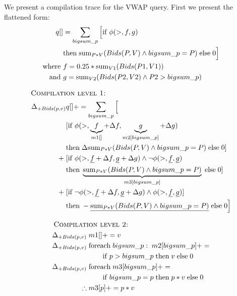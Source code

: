 \begin{example}
We present a compilation trace for the VWAP query. First we present the
flattened form:
\begin{align*}
q[] & = \sum_{bigsum\_p}{\Big[\mathrm{if} \; \phi(>, f, g) }\\
    & \mathrm{then} \; \mathrm{sum}_{P*V}(Bids(P,V) \wedge bigsum\_p = P) \;
      \mathrm{else} \; 0 \Big]\\
\mbox{where } & f = 0.25*\mathrm{sum}_{V1}(Bids(P1,V1))\\
\mbox{and } & g = \mathrm{sum}_{V2}(Bids(P2,V2) \wedge P2 > bigsum\_p)
\end{align*}

\begin{align*}
& \hspace{-1.75cm}\mbox{\sc Compilation level 1:}\\
\Delta_{+Bids(p,v)} & q[] += \sum_{bigsum\_p} \Big[ \\
& [ \algif \; \phi(>,\underbrace{f}_{m1[]}+\Delta f, \underbrace{g}_{m2[bigsum\_p]}+\Delta g) \; \\
& \algthen \; \Delta \algsum_{P*V}(Bids(P,V) \wedge bigsum\_p = P) \;
    \algelse \; 0 ] \\
+ \; & [ \algif \; \phi(>,\underline{f}+\Delta f, \underline{g}+\Delta g) \wedge
    \neg\phi(>,\underline{f},\underline{g}) \\
& \algthen \; \underbrace{\algsum_{P*V}(Bids(P,V) \wedge
    bigsum\_p = P)}_{m3[bigsum\_p]} \;
    \algelse \; 0 ] \\
+ \; & [ \algif \; \neg \phi(>, \underline{f}+\Delta f, \underline{g}+\Delta g)
    \wedge \phi(>,\underline{f},\underline{g}) ] \\
& \algthen \; - \underline{\algsum_{P*V}(Bids(P,V) \wedge bigsum\_p = P)} \;
    \algelse \; 0
\Big]
\end{align*}

\begin{align*}
& \hspace{-1.75cm}\mbox{\sc Compilation level 2:}\\
\Delta_{+Bids(p,v)} \; & m1[] += v\\
\Delta_{+Bids(p,v)} \; & \algforeach \; bigsum\_p : \; m2[bigsum\_p] += \\
& \qquad \algif \; p > bigsum\_p \;\algthen \; v \; \algelse \; 0 \\
\Delta_{+Bids(p,v)} \; & \algforeach \; m3[bigsum\_p] += \\
& \qquad \algif \; bigsum\_p = p \; \algthen \; p*v \; \algelse \; 0\\
\therefore \; & m3[p] += p*v
\end{align*}
\end{example}

